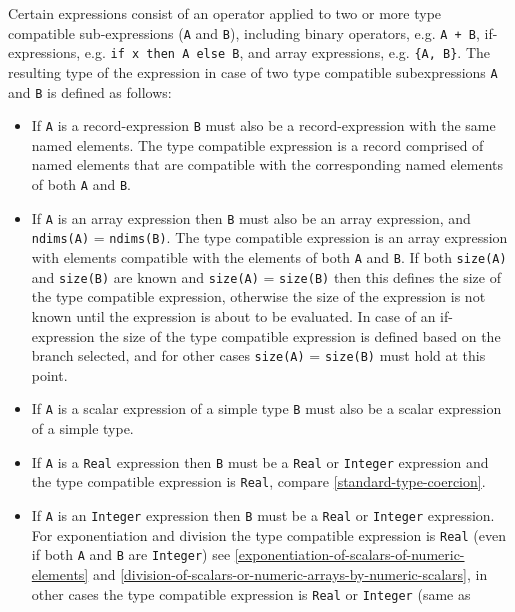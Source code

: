 Certain expressions consist of an operator applied to two or more type
compatible sub-expressions (\lstinline!A! and \lstinline!B!), including binary operators, e.g.
\lstinline!A + B!, if-expressions, e.g. \lstinline!if x then A else B!, and array expressions,
e.g. \lstinline!{A, B}!. The resulting type of the expression in case of two type
compatible subexpressions \lstinline!A! and \lstinline!B! is defined as follows:
\begin{itemize}
\item
  If \lstinline!A! is a record-expression \lstinline!B! must also be a record-expression with
  the same named elements. The type compatible expression is a record
  comprised of named elements that are compatible with the corresponding
  named elements of both \lstinline!A! and \lstinline!B!.
\item
  If \lstinline!A! is an array expression then \lstinline!B! must also be an array expression,
  and \lstinline!ndims(A)! = \lstinline!ndims(B)!. The type compatible expression is an array
  expression with elements compatible with the elements of both \lstinline!A! and \lstinline!B!.
  If both \lstinline!size(A)! and \lstinline!size(B)! are known
	and \lstinline!size(A)! = \lstinline!size(B)! then this
  defines the size of the type compatible expression, otherwise the size
  of the expression is not known until the expression is about to be
  evaluated. In case of an if-expression the size of the type compatible
  expression is defined based on the branch selected, and for other
  cases \lstinline!size(A)! = \lstinline!size(B)! must hold at this point.
\item
  If \lstinline!A! is a scalar expression of a simple type \lstinline!B! must also be a scalar
  expression of a simple type.
\item
  If \lstinline!A! is a \lstinline!Real! expression then \lstinline!B! must be a \lstinline!Real! or \lstinline!Integer! expression
  and the type compatible expression is \lstinline!Real!, compare \autoref{standard-type-coercion}.
\item
  If \lstinline!A! is an \lstinline!Integer! expression then \lstinline!B! must be a \lstinline!Real! or \lstinline!Integer!
  expression. For exponentiation and division the type compatible
  expression is \lstinline!Real! (even if both \lstinline!A! and \lstinline!B! are \lstinline!Integer!) see \autoref{exponentiation-of-scalars-of-numeric-elements}
  and \autoref{division-of-scalars-or-numeric-arrays-by-numeric-scalars}, in
  other cases the type compatible expression is \lstinline!Real! or \lstinline!Integer! (same as

\end{itemize}
